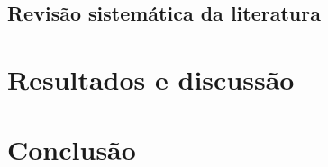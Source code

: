 \documentclass[12pt]{article}
\begin{document}


\subsection{Revisão sistemática da literatura}


\section{Resultados e discussão}


\section{Conclusão}




\end{document}
